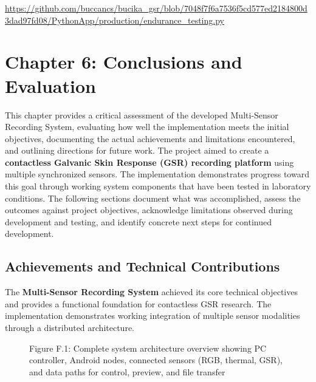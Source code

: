 \documentclass[12pt,a4paper]{article}
\begin{document}
\url{https://github.com/buccancs/bucika_gsr/blob/7048f7f6a7536f5cd577ed2184800d3dad97fd08/PythonApp/production/endurance_testing.py}

\newpage

\section{Chapter 6: Conclusions and Evaluation}\label{chapter-6-conclusions-and-evaluation}

This chapter provides a critical assessment of the developed Multi-Sensor Recording System, evaluating how well the implementation meets the initial objectives, documenting the actual achievements and limitations encountered, and outlining directions for future work. The project aimed to create a \textbf{contactless Galvanic Skin Response (GSR) recording platform} using multiple synchronized sensors. The implementation demonstrates progress toward this goal through working system components that have been tested in laboratory conditions. The following sections document what was accomplished, assess the outcomes against project objectives, acknowledge limitations observed during development and testing, and identify concrete next steps for continued development.

\subsection{Achievements and Technical Contributions}\label{achievements-and-technical-contributions}

The \textbf{Multi-Sensor Recording System} achieved its core technical objectives and provides a functional foundation for contactless GSR research. The implementation demonstrates working integration of multiple sensor modalities through a distributed architecture.

\begin{figure}
\centering
{}
\caption{Figure F.1: Complete system architecture overview showing PC controller, Android nodes, connected sensors (RGB, thermal, GSR), and data paths for control, preview, and file transfer}
\end{figure}
\end{document}
